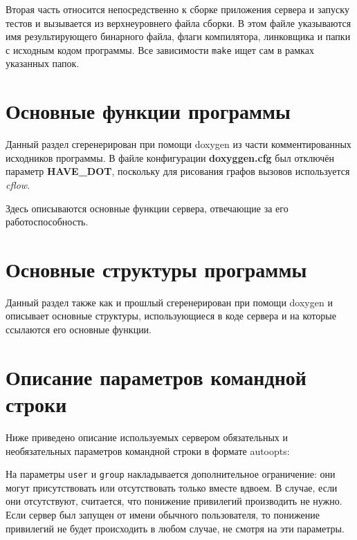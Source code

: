 \documentclass[a4paper,12pt]{report}
\begin{document}
Вторая часть относится непосредственно к сборке приложения сервера и запуску тестов и вызывается из верхнеуровнего файла сборки. В этом файле указываются имя результирующего бинарного файла, флаги компилятора, линковщика и папки с исходным кодом программы. Все зависимости \texttt{make} ищет сам в рамках указанных папок.


\section{Основные функции программы}

Данный раздел сгеренерирован при помощи doxygen из части комментированных исходников программы. В файле конфигурации \textbf{doxyggen.cfg} был отключён параметр \textbf{HAVE\_DOT}, поскольку для рисования графов вызовов используется \textit{cflow}.

Здесь описываются основные функции сервера, отвечающие за его работоспособность.





\section{Основные структуры программы}

Данный раздел также как и прошлый сгеренерирован при помощи doxygen и описывает основные структуры, использующиеся в коде сервера и на которые ссылаются его основные функции.







\section{Описание параметров командной строки}

Ниже приведено описание используемых сервером обязательных и необязательных параметров командной строки в формате autoopts:


На параметры \texttt{user} и \texttt{group} накладывается дополнительное ограничение: они могут присутствовать или отсутствовать только вместе вдвоем. В случае, если они отсутствуют, считается, что понижение привилегий производить не нужно. Если сервер был запущен от имени обычного пользователя, то понижение привилегий не будет происходить в любом случае, не смотря на эти параметры.
\end{document}

